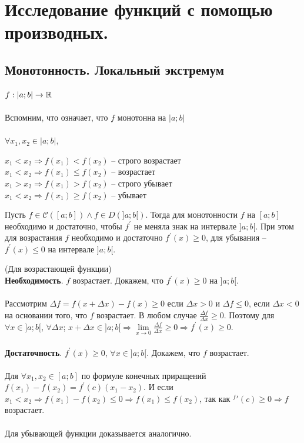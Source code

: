 \chapter{Исследование функций с помощью производных.}
\section{Монотонность. Локальный экстремум}
$ f : |a;b| \rightarrow \mathbb{R}$\\\\
Вспомним, что означает, что $f$ монотонна на $|a;b|$\\\\
$\forall x_1,x_2 \in |a;b|$, \begin{center}$x_1 < x_2 \Rightarrow f(x_1) < f(x_2)$ -- строго возрастает\\
	$x_1 < x_2 \Rightarrow f(x_1) \le f(x_2)$ -- возрастает\\
	$x_1 > x_2 \Rightarrow f(x_1) > f(x_2)$ -- строго убывает\\
	$x_1 < x_2 \Rightarrow f(x_1) \ge f(x_2)$ -- убывает\\
\end{center}
\begin{theorem} Пусть $f \in \mathcal{C} ([a;b]) \wedge f \in D(]a;b[)$. Тогда для монотонности $f$ на $[a;b]$ необходимо и достаточно, чтобы $f^\prime$ не меняла знак на интервале $]a;b[$. При этом для возрастания $f$ необходимо и  достаточно $f^\prime(x) \ge 0$, для убывания -- $f^\prime(x) \le 0$ на интервале $]a;b[$. 
\end{theorem}
\begin{Proof}
	(Для возрастающей функции)\\
	\textbf{Необходимость}. $f$ возрастает. Докажем, что $f^\prime (x) \ge 0$ на $]a;b[$.\\\\ Рассмотрим $\Delta f = f(x + \Delta x) - f(x) \ge 0$ если  $\Delta x > 0$ и $\Delta f \le 0$, если $\Delta x < 0$ на основании того, что $f$ возрастает. В любом случае $\frac{\Delta f}{\Delta x} \ge 0$. Поэтому для $\forall x \in ]a;b[$, $\forall \Delta x$; $x + \Delta x \in ]a;b[ \Rightarrow \lim\limits_{x \rightarrow 0}\frac{\Delta f}{\Delta x} \ge 0 \Rightarrow f^\prime(x) \ge 0$.\\\\
	\textbf{Достаточность}.  $f^\prime(x) \ge 0$, $\forall x \in ]a;b[$. Докажем, что $f$ возрастает.\\\\ Для $\forall x_1,x_2 \in [a;b]$ по формуле конечных приращений $f(x_1) - f(x_2) = f^\prime(c)(x_1 - x_2)$. И если $x_1 < x_2 \Rightarrow f(x_1) - f(x_2) \le 0 \Rightarrow f(x_1) \le f(x_2)$, так как $^f\prime(c) \ge 0 \Rightarrow f$ возрастает.\\\\
	Для убывающей функции доказывается аналогично.
\end{Proof}
